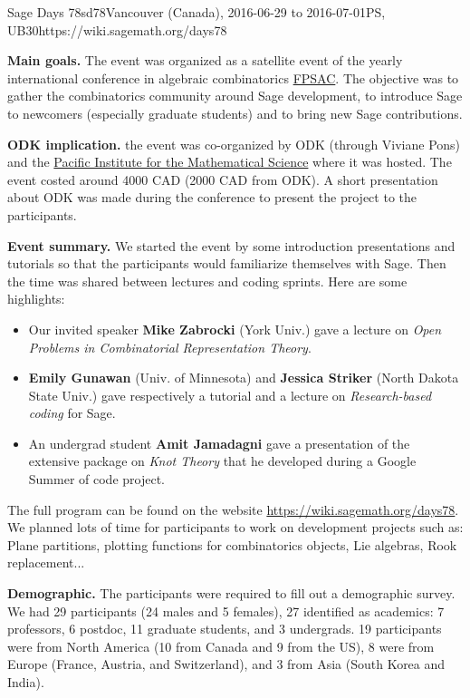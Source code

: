 \begin{event}{Sage Days 78}{sd78}{Vancouver (Canada), 2016-06-29 to 2016-07-01}{PS, UB}{30}{https://wiki.sagemath.org/days78}

\textbf{Main goals.} The event was organized as a satellite event of the yearly international conference
in algebraic combinatorics \href{https://sites.google.com/site/fpsac2016/}{FPSAC}. The objective was to gather
the combinatorics community around Sage development, to introduce Sage to newcomers (especially graduate students) and
to bring new Sage contributions.

\textbf{ODK implication.} the event was co-organized by ODK (through Viviane Pons) and the 
\href{https://www.pims.math.ca/}{Pacific Institute for the Mathematical Science} where
it was hosted. The event costed around 4000 CAD (2000 CAD from ODK).
 A short presentation about ODK was made during the conference to present 
the project to the participants.

\textbf{Event summary.} We started the event by some introduction presentations and tutorials so that
the participants would familiarize themselves with Sage. Then the time was shared between lectures
and coding sprints. Here are some highlights:
\begin{itemize}
\item Our invited speaker \textbf{Mike Zabrocki} (York Univ.) gave a lecture on \emph{Open Problems in Combinatorial Representation Theory}.

\item \textbf{Emily Gunawan} (Univ. of Minnesota) and \textbf{Jessica Striker} (North Dakota State Univ.) gave respectively
a tutorial and a lecture on \emph{Research-based coding} for Sage.

\item An undergrad student \textbf{Amit Jamadagni} gave a presentation of the extensive package on \emph{Knot Theory} that
he developed during a Google Summer of code project.
\end{itemize}

The full program can be found on the website \url{https://wiki.sagemath.org/days78}. We planned lots of time for 
participants to work on development projects such as: Plane partitions, plotting functions for combinatorics
objects, Lie algebras, Rook replacement...

\textbf{Demographic.} The participants were required to fill out a demographic survey. We had 29 participants (24 males and
5 females), 27 identified as academics: 7 professors, 6 postdoc, 11 graduate students, and 3 undergrads. 19 participants
were from North America (10 from Canada and 9 from the US), 8 were from Europe (France, Austria, and Switzerland), and 3 from 
Asia (South Korea and India).


\end{event}
